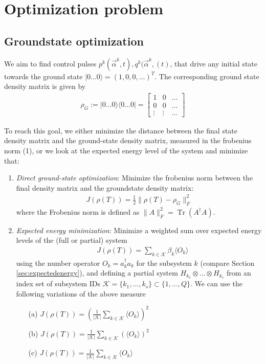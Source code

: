 \documentclass[letterpaper]{article}
\DeclareMathOperator{\Tr}{Tr}
\begin{document}
\section{Optimization problem}

\subsection{Groundstate optimization}
We aim to find control pulses $p^k(\vec{\alpha}^k, t), q^k(\vec{\alpha}^k, (t)$, that drive any initial state towards the ground state $|0\dots 0\rangle = (1, 0, 0, \dots )^T$. The corresponding ground state density matrix is given by
\begin{align}
      \rho_{G} := |0\dots 0\rangle \langle 0 \dots 0 | = \begin{bmatrix} 1      & 0      &  \dots   \\ 
                                         0      & 0      &  \dots  \\ 
                                         \vdots & \vdots &  \dots 
                    \end{bmatrix}
\end{align}

To reach this goal, we either minimize the distance between the final state density matrix and the ground-state density matrix, measured in the frobenius norm (1), or we look at the expected energy level of the system and minimize that:
\begin{enumerate}
  \item \textit{Direct ground-state optimization}: Minimize the frobenius norm between the final density matrix and the groundstate density matrix:
    \begin{align}
      J(\rho(T)) = \frac 12 \| \rho(T) - \rho_G \|^2_F 
    \end{align}
    where the Frobenius norm is defined as $\|A\|^2_F = \Tr(A^{\dagger}A)$.
  \item \textit{Expected energy minimization}: Minimize a weighted sum over expected energy levels of the (full or partial) system
    \begin{align}
       \quad J(\rho(T)) = \sum_{k\in \mathcal{K}} \beta_k \langle O_k \rangle 
    \end{align}
    using the number operator $O_k = a_k^\dag a_k$ for the subsystem $k$ (compare Section \ref{sec:expectedenergy}), and defining a partial system $H_{k_1}\otimes \dots \otimes H_{k_s}$ from an index set of subsystem IDs $\mathcal{K}=\{k_1,\dots,k_s\}\subset \{1,\dots,Q\}$. We can use the following variations of the above measure
    \begin{enumerate}
      \item[(a)] $J(\rho(T)) = \left(\frac{1}{|\mathcal{K}|}\sum_{k\in\mathcal{K}}\langle O_k \rangle \right)^2$
      \item[(b)] $J(\rho(T)) = \frac{1}{|\mathcal{K}|}\sum_{k\in\mathcal{K}}\left(\langle O_k \rangle \right)^2 $
      \item[(c)] $J(\rho(T)) = \frac{1}{|\mathcal{K}|}\sum_{k\in\mathcal{K}}\langle O_k \rangle$
    \end{enumerate}

\end{enumerate}
\end{document}

